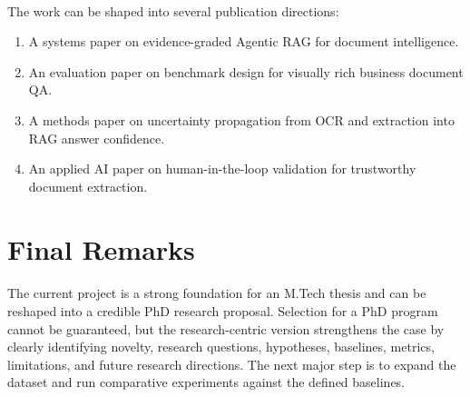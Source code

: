 \paragraph{} The work can be shaped into several publication directions:

\begin{enumerate}
    \item A systems paper on evidence-graded Agentic RAG for document intelligence.
    \item An evaluation paper on benchmark design for visually rich business document QA.
    \item A methods paper on uncertainty propagation from OCR and extraction into RAG answer confidence.
    \item An applied AI paper on human-in-the-loop validation for trustworthy document extraction.
\end{enumerate}

\section{Final Remarks}
\paragraph{} The current project is a strong foundation for an M.Tech thesis and can be reshaped into a credible PhD research proposal. Selection for a PhD program cannot be guaranteed, but the research-centric version strengthens the case by clearly identifying novelty, research questions, hypotheses, baselines, metrics, limitations, and future research directions. The next major step is to expand the dataset and run comparative experiments against the defined baselines.

